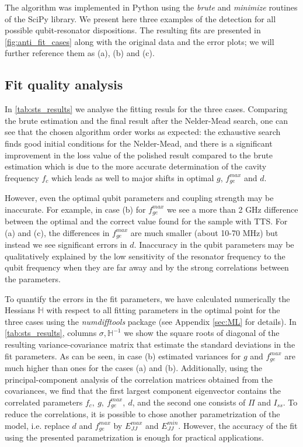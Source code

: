 \documentclass[%
 aip,
 draft,
 amsmath,amssymb,
 reprint,%
]{revtex4-1}
\begin{document}
The algorithm was implemented in Python using the \textit{brute} and \textit{minimize} routines of the SciPy\cite{scipy} library. We present here three examples of the detection for all possible qubit-resonator dispositions.  The resulting fits are presented in \autoref{fig:anti_fit_cases} along with the original data and the error plots; we will further reference them as (a), (b) and (c).

\subsection{Fit quality analysis} 

In \autoref{tab:sts_results} we analyse the fitting resuls for the three cases. Comparing the brute estimation and the final result after the Nelder-Mead search, one can see that the chosen algorithm order works as expected: the exhaustive search finds good initial conditions for the Nelder-Mead, and there is a significant improvement in the loss value of the polished result compared to the brute estimation which is due to the more accurate determination of the cavity frequency $f_c$ which leads as well to major shifts in optimal $g$, $f_{ge}^{max}$ and $d$.

However, even the optimal qubit parameters and coupling strength may be inaccurate. For example, in case (b) for $f_{ge}^{max}$ we see a more than 2 GHz difference between the optimal and the correct value found for the sample with TTS. For (a) and (c), the differences in $f_{ge}^{max}$ are much smaller (about 10-70 MHz) but instead we see significant errors in $d$. Inaccuracy in the qubit parameters may be qualitatively explained by the low sensitivity of the resonator frequency to the qubit frequency when they are far away and by the strong correlations between the parameters.

To quantify the errors in the fit parameters, we have calculated numerically the Hessians $\mathbb{H}$ with respect to all fitting parameters in the optimal point for the three cases using the \textit{numdifftools}\cite{numdifftools} package (see Appendix \ref{sec:ML} for details). In \autoref{tab:sts_results}, columns $\sigma, \mathbb{H}^{-1}$ we show the square roots of diagonal of the resulting variance-covariance matrix that estimate the standard deviations in the fit parameters. As can be seen, in case (b) estimated variances for $g$ and $f_{ge}^{max}$ are much higher than ones for the cases (a) and (b). Additionally, using the principal-component analysis of the correlation matrices obtained from the covariances, we find that the first largest component eigenvector contains the correlated parameters $f_c,\ g,\ f_{ge}^{max},\ d$, and the second one consists of $\Pi$ and $I_{ss}$. To reduce the correlations, it is possible to chose another parametrization of the model, i.e. replace $d$ and $f_{ge}^{max}$ by $ E_{JJ}^{max} $ and $ E_{JJ}^{min} $. However, the accuracy of the fit using the presented parametrization is enough for practical applications.
\end{document}
